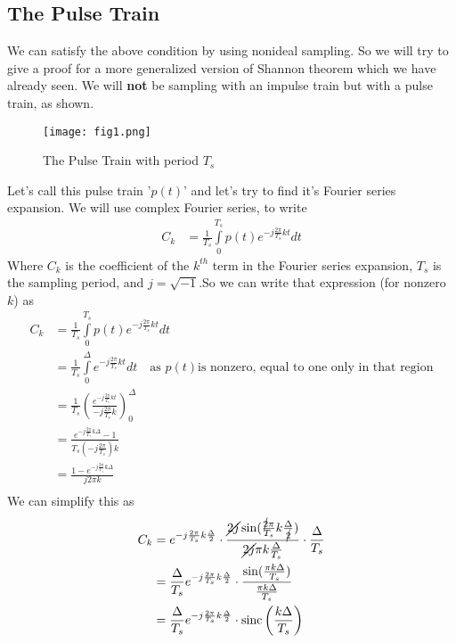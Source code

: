 \subsection{The Pulse Train}
We can satisfy the above condition by using nonideal sampling. So we will try to give a proof for a more generalized version of Shannon theorem which we have already seen. We will \textbf{not} be sampling with an impulse train but with a pulse train, as shown.\\
\begin{figure}[ht]
\centering
\texttt{[image: fig1.png]}
\caption{The Pulse Train with period $T_{s}$}
\end{figure}
Let's call this pulse train '$p(t)$' and let's try to find it's Fourier series expansion. We will use complex Fourier series, to write
\begin{align*}
C_{k}&=\frac{1}{T_{s}}\int\limits_{0}^{T_{s}} p(t) e^{-j\frac{2\pi}{T_{s}}kt}dt
\end{align*}
Where $C_{k}$ is the coefficient of the $k^{th}$ term in the Fourier series expansion, $T_{s}$ is the sampling period, and $j=\sqrt{-1}$.So we can write that expression (for nonzero $k$) as
\begin{align*}
C_{k}&=\frac{1}{T_{s}}\int\limits_{0}^{T_{s}} p(t) e^{-j\frac{2\pi}{T_{s}}kt}dt\\
         &=\frac{1}{T_{s}}\int\limits_{0}^{\Delta} e^{-j\frac{2\pi}{T_{s}}kt}dt\quad\text{as }p(t) \text{is nonzero, equal to one only in that region}\\
         &=\frac{1}{T_{s}}\left(\frac{e^{-j\frac{2\pi}{T_{s}}kt}}{-j\frac{2\pi}{T_{s}}k}\right)_{0}^{\Delta}\\
         &=\frac{e^{-j\frac{2\pi}{T_{s}}k\Delta}-1}{T_{s}\left(-j\frac{2\pi}{T_{s}}\right)k}\\
         &=\frac{1-e^{-j\frac{2\pi}{T_{s}}k\Delta}}{j2\pi k}\\
\end{align*}
We can simplify this as
\begin{align*}
C_{k}&=e^{-j\frac{2\pi}{T_{s}}k\frac{\Delta}{2}}\cdot \frac{\cancel{2j}\sin(\frac{\cancel{2}\pi}{T_{s}}k\frac{\Delta}{\cancel{2}})}{\cancel{2j}\pi k\frac{\Delta}{T_{s}}}\cdot\frac{\Delta}{T_{s}}\\
&=\frac{\Delta}{T_{s}}e^{-j\frac{2\pi}{T_{s}}k\frac{\Delta}{2}}\cdot\frac{\sin(\frac{\pi k \Delta}{T_{s}})}{\frac{\pi k \Delta}{T_{s}}}\\
&=\frac{\Delta}{T_{s}}e^{-j\frac{2\pi}{T_{s}}k\frac{\Delta}{2}}\cdot \text{sinc}\left(\frac{k\Delta}{T_{s}}\right)
\end{align*}
